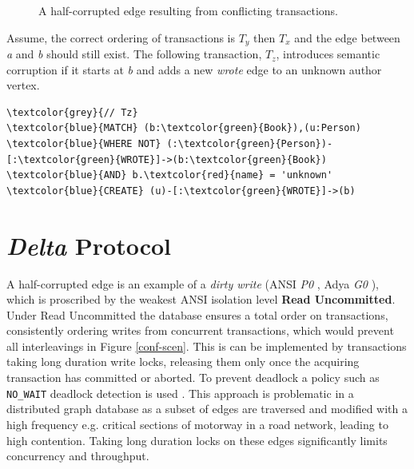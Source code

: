 \documentclass[sigplan,10pt]{acmart}
\begin{document}
\begin{figure}[H]
  \centering
  \caption{A half-corrupted edge resulting from conflicting transactions.}
  \label{half-corrupted}
\end{figure}

Assume, the correct ordering of transactions is $T_y$ then $T_x$ and the edge between \emph{a} and \emph{b} should still exist. The following transaction, $T_z$, introduces semantic corruption if it starts at \emph{b} and adds a new \emph{wrote} edge to an unknown author vertex.

\begin{Verbatim}[commandchars=\\\{\},fontsize=\small,xleftmargin=.2in]
\textcolor{grey}{// Tz}
\textcolor{blue}{MATCH} (b:\textcolor{green}{Book}),(u:Person)
\textcolor{blue}{WHERE NOT} (:\textcolor{green}{Person})-[:\textcolor{green}{WROTE}]->(b:\textcolor{green}{Book})
\textcolor{blue}{AND} b.\textcolor{red}{name} = 'unknown'
\textcolor{blue}{CREATE} (u)-[:\textcolor{green}{WROTE}]->(b)
\end{Verbatim}

\section{\emph{Delta} Protocol}

A half-corrupted edge is an example of a \emph{dirty write} (ANSI \emph{P0} \cite{Berenson1995}, Adya \emph{G0} \cite{Adya2000}), which is proscribed by the weakest ANSI isolation level \textbf{Read Uncommitted}. Under Read Uncommitted the database ensures a total order on transactions, consistently ordering writes from concurrent transactions, which would prevent all interleavings in Figure \ref{conf-scen}. This is can be implemented by transactions taking long duration write locks\cite{Berenson1995}, releasing them only once the acquiring transaction has committed or aborted. To prevent deadlock a policy such as \texttt{NO_WAIT} deadlock detection is used \cite{Harding2017}. This approach is problematic in a distributed graph database as a subset of edges are traversed and modified with a high frequency e.g. critical sections of motorway in a road network, leading to high contention. Taking long duration locks on these edges significantly limits concurrency and throughput.
\end{document}
